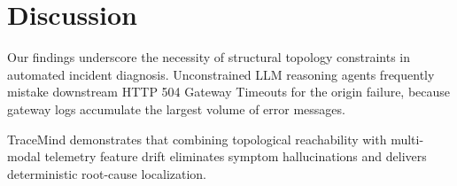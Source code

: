 \section{Discussion}
\label{sec:discussion}

Our findings underscore the necessity of structural topology constraints in automated incident diagnosis. Unconstrained LLM reasoning agents frequently mistake downstream HTTP 504 Gateway Timeouts for the origin failure, because gateway logs accumulate the largest volume of error messages.

TraceMind demonstrates that combining topological reachability with multi-modal telemetry feature drift eliminates symptom hallucinations and delivers deterministic root-cause localization.
